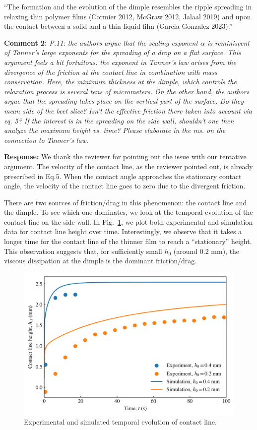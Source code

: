 \documentclass[11pt]{article}
\newif\ifhighlight
\newcommand{\hl}[1]{\ifhighlight\textcolor{blue}{#1}\else#1\fi}
\begin{document}
\hl{
``The formation and the evolution of the dimple resembles the ripple spreading in relaxing thin polymer films (Cormier 2012, McGraw 2012, Jalaal 2019) and upon the contact between a solid and a thin liquid film (Garcia-Gonzalez 2023).''
}

\bigskip
\begin{siderules}
\textbf{Comment 2:} \textit{P.11: the authors argue that the scaling exponent $\alpha$ is reminiscent of Tanner’s large exponents for the spreading of a drop on a flat surface. This argument feels a bit fortuitous: the exponent in Tanner’s law arises from the divergence of the friction at the contact line in combination with mass conservation. Here, the minimum thickness at the dimple, which controls the relaxation process is several tens of micrometers. On the other hand, the authors argue that the spreading takes place on the vertical part of the surface. Do they mean side of the beet slice? Isn’t the effective friction there taken into account via eq. 5? If the interest is in the spreading on the side wall, shouldn’t one then analyze the maximum height vs. time? Please elaborate in the ms. on the connection to Tanner's law.}
\end{siderules}

\textbf{Response:} We thank the reviewer for pointing out the issue with our tentative argument. The velocity of the contact line, as the reviewer pointed out, is already prescribed in Eq.5. When the contact angle approaches the stationary contact angle, the velocity of the contact line goes to zero due to the divergent friction.

There are two sources of friction/drag in this phenomenon: the contact line and the dimple. To see which one dominates, we look at the temporal evolution of the contact line on the side wall. In Fig.~\ref{fig:contact-line}, we plot both experimental and simulation data for contact line height over time. Interestingly, we observe that it takes a longer time for the contact line of the thinner film to reach a ``stationary'' height. This observation suggests that, for sufficiently small $h_0$ (around 0.2 mm), the viscous dissipation at the dimple is the dominant friction/drag. 

\begin{figure}
    \centering
    \includegraphics[width=0.6\linewidth]{contact_line_motion._thicknesspng.png}
    \caption{Experimental and simulated temporal evolution of contact line.}
    \label{fig:contact-line}
\end{figure}
\end{document}
